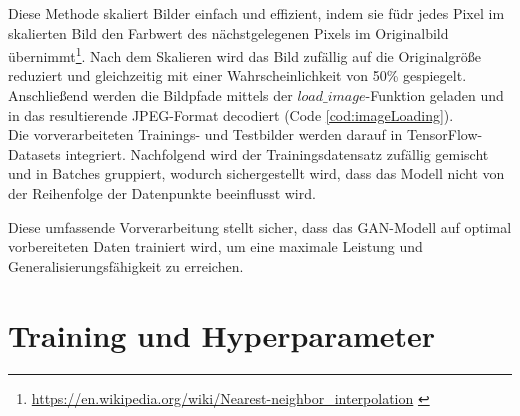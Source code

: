 Diese Methode skaliert Bilder einfach und effizient, indem sie füdr jedes Pixel im skalierten Bild den Farbwert des nächstgelegenen Pixels im Originalbild übernimmt\footnote{\url{https://en.wikipedia.org/wiki/Nearest-neighbor_interpolation} \label{note:nearestNeighbor}}.
Nach dem Skalieren wird das Bild zufällig auf die Originalgröße reduziert und gleichzeitig mit einer Wahrscheinlichkeit von 50\% gespiegelt.
Anschließend werden die Bildpfade mittels der $load\_image$-Funktion geladen und in das resultierende JPEG-Format decodiert (Code \ref{cod:imageLoading}).
\\\newline
Die vorverarbeiteten Trainings- und Testbilder werden darauf in TensorFlow-Datasets integriert. Nachfolgend wird der Trainingsdatensatz zufällig gemischt und in Batches gruppiert, wodurch sichergestellt wird, dass das Modell nicht von der Reihenfolge der Datenpunkte beeinflusst wird.


Diese umfassende Vorverarbeitung stellt sicher, dass das GAN-Modell auf optimal vorbereiteten Daten trainiert wird, um eine maximale Leistung und Generalisierungsfähigkeit zu erreichen.




\newpage
\section{Training und Hyperparameter}

